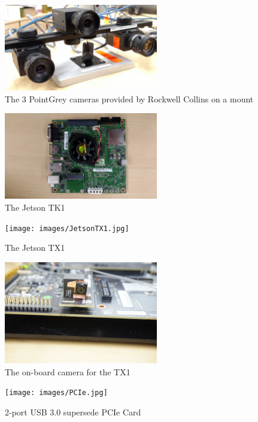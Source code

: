 \begin{figure}[!ht]
	  \centering
		    \includegraphics[width=0.6\textwidth,natwidth=610,natheight=642]{images/cameras.jpg}
		    \caption{The 3 PointGrey cameras provided by Rockwell Collins on a mount}
				\end{figure} 
 \begin{figure}[!ht]
	  \centering
		    \includegraphics[width=0.6\textwidth,natwidth=610,natheight=642]{images/JetsonTK1.jpg}
		      \caption{The Jetson TK1}
				\end{figure}
\begin{figure}[!ht]
	  \centering
		    \texttt{[image: images/JetsonTX1.jpg]}
		      \caption{The Jetson TX1}
				\end{figure}
\begin{figure}[!ht]
	  \centering
		    \includegraphics[width=0.6\textwidth,natwidth=610,natheight=642]{images/onboardCamera.JPG}
		     \caption{The on-board camera for the TX1}
				\end{figure}

\begin{figure}[!ht]
	  \centering
		    \texttt{[image: images/PCIe.jpg]}
		      \caption{2-port USB 3.0 supersede PCIe Card}
				\end{figure}

